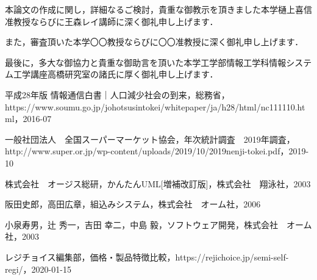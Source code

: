 本論文の作成に関し，詳細なるご検討，貴重な御教示を頂きました本学樋上喜信准教授ならびに王森レイ講師に深く御礼申し上げます．

また，審査頂いた本学〇〇教授ならびに〇〇准教授に深く御礼申し上げます．

最後に，多大な御協力と貴重な御助言を頂いた本学工学部情報工学科情報システム工学講座高橋研究室の諸氏に厚く御礼申し上げます．


\begin{thebibliography}{99}

平成28年版 情報通信白書｜人口減少社会の到来，総務省，https://www.soumu.go.jp/johotsusintokei/whitepaper/ja/h28/html/nc111110.html，2016-07


一般社団法人　全国スーパーマーケット協会，年次統計調査　2019年調査，http://www.super.or.jp/wp-content/uploads/2019/10/2019nenji-tokei.pdf，2019-10


株式会社　オージス総研，かんたんUML[増補改訂版]，株式会社　翔泳社，2003


阪田史郎，高田広章，組込みシステム，株式会社　オーム社，2006


小泉寿男，辻 秀一，吉田 幸二，中島 毅，ソフトウェア開発，株式会社　オーム社，2003


レジチョイス編集部，価格・製品特徴比較，https://rejichoice.jp/semi-self-regi/，2020-01-15


\end{thebibliography}

